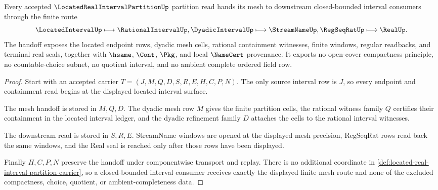\begin{theorem}
\label{thm:located-real-interval-partition-mesh-handoff}
Every accepted $\LocatedRealIntervalPartitionUp$ partition read hands its mesh to downstream closed-bounded interval consumers through the finite route
$$
\LocatedIntervalUp \longmapsto \RationalIntervalUp,\DyadicIntervalUp \longmapsto \StreamNameUp,\RegSeqRatUp \longmapsto \RealUp .
$$
The handoff exposes the located endpoint rows, dyadic mesh cells, rational containment witnesses, finite windows, regular readbacks, and terminal real seals, together with $\hsame$, $\Cont$, $\Pkg$, and local $\NameCert$ provenance. It exports no open-cover compactness principle, no countable-choice subnet, no quotient interval, and no ambient complete ordered field row.
\end{theorem}
\begin{proof}
Start with an accepted carrier $T=(J,M,Q,D,S,R,E,H,C,P,N)$. The only source interval row is $J$, so every endpoint and containment read begins at the displayed located interval surface.

The mesh handoff is stored in $M,Q,D$. The dyadic mesh row $M$ gives the finite partition cells, the rational witness family $Q$ certifies their containment in the located interval ledger, and the dyadic refinement family $D$ attaches the cells to the rational interval witnesses.

The downstream read is stored in $S,R,E$. StreamName windows are opened at the displayed mesh precision, RegSeqRat rows read back the same windows, and the Real seal is reached only after those rows have been displayed.

Finally $H,C,P,N$ preserve the handoff under componentwise transport and replay. There is no additional coordinate in \autoref{def:located-real-interval-partition-carrier}, so a closed-bounded interval consumer receives exactly the displayed finite mesh route and none of the excluded compactness, choice, quotient, or ambient-completeness data.
\end{proof}


